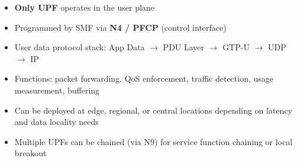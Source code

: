
\begin{itemize}
\tightlist
\item
  \textbf{Only UPF} operates in the user plane
\item
  Programmed by SMF via \textbf{N4 /\allowbreak{} PFCP} (control interface)
\item
  User data protocol stack: App Data \ensuremath{\to} PDU Layer \ensuremath{\to} GTP-U \ensuremath{\to} UDP \ensuremath{\to} IP
\item
  Functions: packet forwarding, QoS enforcement, traffic detection, usage measurement, buffering
\item
  Can be deployed at edge, regional, or central locations depending on latency and data locality needs
\item
  Multiple UPFs can be chained (via N9) for service function chaining or local breakout
\end{itemize}






